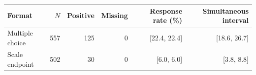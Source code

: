 \begin{tabular}{lrrrrr}
\toprule
Format & $N$ & Positive & Missing & Response rate (\%) & Simultaneous interval \\
\midrule
Multiple choice & 557 & 125 & 0 & [22.4, 22.4] & [18.6, 26.7] \\
Scale endpoint & 502 &  30 & 0 & [6.0, 6.0] & [3.8, 8.8] \\
\bottomrule
\end{tabular}
